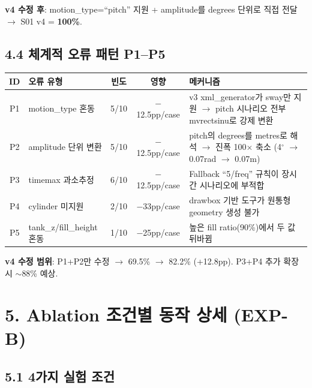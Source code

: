 \documentclass[10pt,a4paper]{article}
\begin{document}
\textbf{v4 수정 후}: motion\_type=``pitch'' 지원 + amplitude를 degrees 단위로 직접 전달 $\rightarrow$ S01 v4 = \textbf{100\%}.

\subsection{4.4 체계적 오류 패턴 P1--P5}

\begin{center}
\small
\begin{tabular}{clccp{5.5cm}}
\toprule
\textbf{ID} & \textbf{오류 유형} & \textbf{빈도} & \textbf{영향} & \textbf{메커니즘} \\
\midrule
P1 & motion\_type 혼동 & 5/10 & $-$12.5pp/case & v3 xml\_generator가 sway만 지원 $\rightarrow$ pitch 시나리오 전부 mvrectsinu로 강제 변환 \\
P2 & amplitude 단위 변환 & 5/10 & $-$12.5pp/case & pitch의 degrees를 metres로 해석 $\rightarrow$ 진폭 100$\times$ 축소 (4$^\circ$ $\rightarrow$ 0.07rad $\rightarrow$ 0.07m) \\
P3 & timemax 과소추정 & 6/10 & $-$12.5pp/case & Fallback ``5/freq'' 규칙이 장시간 시나리오에 부적합 \\
P4 & cylinder 미지원 & 2/10 & $-$33pp/case & drawbox 기반 도구가 원통형 geometry 생성 불가 \\
P5 & tank\_z/fill\_height 혼동 & 1/10 & $-$25pp/case & 높은 fill ratio(90\%)에서 두 값 뒤바뀜 \\
\bottomrule
\end{tabular}
\end{center}

\textbf{v4 수정 범위}: P1+P2만 수정 $\rightarrow$ 69.5\% $\rightarrow$ 82.2\% (+12.8pp). P3+P4 추가 확장 시 $\sim$88\% 예상.

\section{5. Ablation 조건별 동작 상세 (EXP-B)}

\subsection{5.1 4가지 실험 조건}
\end{document}
